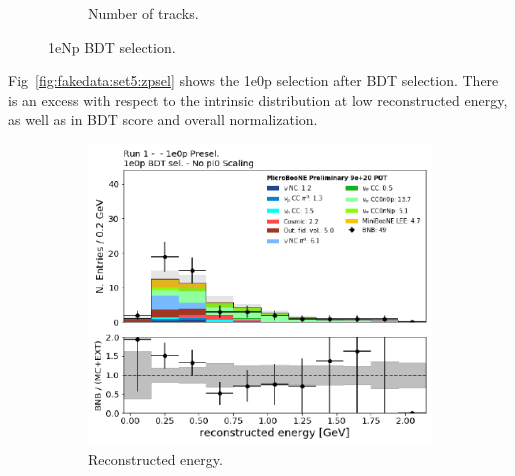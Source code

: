 \begin{figure}[H]
\begin{center}
\begin{subfigure}[b]{0.45\textwidth}
    \caption{\label{fig:fakedata:set5:Np_postsel_ntracks} Number of tracks.}
    \end{subfigure}
\caption{\label{fig:fakedata:set5:npsel} 1eNp BDT selection.}
\end{center}
\end{figure}

Fig~\ref{fig:fakedata:set5:zpsel} shows the 1e0p selection after BDT selection.  There is an excess with respect to the \nue intrinsic distribution at low reconstructed energy, as well as in BDT score and overall normalization.

\begin{figure}[H] 
\begin{center}
    \begin{subfigure}[b]{0.3\textwidth}
    \centering
    \includegraphics[width=1.00\textwidth]{Fakedata/set5/zp_postsel_recoe.pdf}
    \caption{\label{fig:fakedata:set5:zp_postsel_recoe} Reconstructed energy.}
    \end{subfigure}
    \begin{subfigure}[b]{0.3\textwidth}
    \centering

\end{subfigure}
\end{center}
\end{figure}
